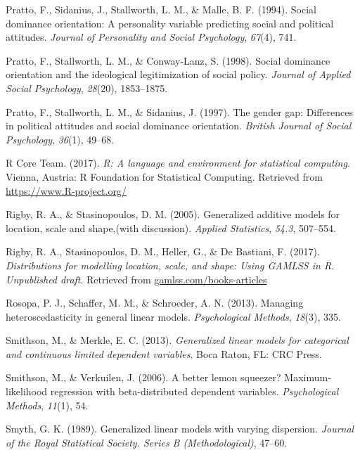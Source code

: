 \documentclass[english,man]{apa6}
\theoremstyle{definition}
\theoremstyle{definition}
\theoremstyle{remark}
\begin{document}
\hypertarget{ref-pratto1994social}{}
Pratto, F., Sidanius, J., Stallworth, L. M., \& Malle, B. F. (1994).
Social dominance orientation: A personality variable predicting social
and political attitudes. \emph{Journal of Personality and Social
Psychology}, \emph{67}(4), 741.

\hypertarget{ref-pratto1998social}{}
Pratto, F., Stallworth, L. M., \& Conway-Lanz, S. (1998). Social
dominance orientation and the ideological legitimization of social
policy. \emph{Journal of Applied Social Psychology}, \emph{28}(20),
1853--1875.

\hypertarget{ref-pratto1997gender}{}
Pratto, F., Stallworth, L. M., \& Sidanius, J. (1997). The gender gap:
Differences in political attitudes and social dominance orientation.
\emph{British Journal of Social Psychology}, \emph{36}(1), 49--68.

\hypertarget{ref-rcore2017}{}
R Core Team. (2017). \emph{R: A language and environment for statistical
computing}. Vienna, Austria: R Foundation for Statistical Computing.
Retrieved from \url{https://www.R-project.org/}

\hypertarget{ref-rigby2005generalized}{}
Rigby, R. A., \& Stasinopoulos, D. M. (2005). Generalized additive
models for location, scale and shape,(with discussion). \emph{Applied
Statistics}, \emph{54.3}, 507--554.

\hypertarget{ref-rigby2017distributions}{}
Rigby, R. A., Stasinopoulos, D. M., Heller, G., \& De Bastiani, F.
(2017). \emph{Distributions for modelling location, scale, and shape:
Using GAMLSS in R. Unpublished draft}. Retrieved from
\url{gamlss.com/books-articles}

\hypertarget{ref-rosopa2013managing}{}
Rosopa, P. J., Schaffer, M. M., \& Schroeder, A. N. (2013). Managing
heteroscedasticity in general linear models. \emph{Psychological
Methods}, \emph{18}(3), 335.

\hypertarget{ref-smithson2013generalized}{}
Smithson, M., \& Merkle, E. C. (2013). \emph{Generalized linear models
for categorical and continuous limited dependent variables}. Boca Raton,
FL: CRC Press.

\hypertarget{ref-smithson2006better}{}
Smithson, M., \& Verkuilen, J. (2006). A better lemon squeezer?
Maximum-likelihood regression with beta-distributed dependent variables.
\emph{Psychological Methods}, \emph{11}(1), 54.

\hypertarget{ref-smyth1989generalized}{}
Smyth, G. K. (1989). Generalized linear models with varying dispersion.
\emph{Journal of the Royal Statistical Society. Series B
(Methodological)}, 47--60.
\end{document}
